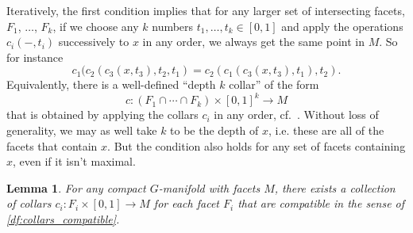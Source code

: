 \documentclass[11pt]{amsart}
\newtheorem{lem}{Lemma}[section]
\theoremstyle{definition}
\numberwithin{equation}{section}
\numberwithin{figure}{section}
\begin{document}
Iteratively, the first condition implies that for any larger set of intersecting facets, $F_1$, $\ldots$, $F_k$, if we choose any $k$ numbers $t_1, \ldots, t_k \in [0,1]$ and apply the operations $c_i(-,t_i)$ successively to $x$ in any order, we always get the same point in $M$. So for instance
\[ c_1(c_2(c_3(x,t_3),t_2,t_1) = c_2(c_1(c_3(x,t_3),t_1),t_2). \]
Equivalently, there is a well-defined ``depth $k$ collar'' of the form
\[ c\colon (F_1 \cap \cdots \cap F_k) \times [0,1]^k \to M \]
that is obtained by applying the collars $c_i$ in any order, cf.~\cite[Prop 7.1]{qin_gluing}. Without loss of generality, we may as well take $k$ to be the depth of $x$, i.e. these are all of the facets that contain $x$. But the condition also holds for any set of facets containing $x$, even if it isn't maximal.

\begin{lem}\label{compatible_collars_exist}
	For any compact $G$-manifold with facets $M$, there exists a collection of collars $c_i\colon F_i \times [0,1] \to M$ for each facet $F_i$ that are compatible in the sense of \autoref{df:collars_compatible}.
\end{lem}
\end{document}
